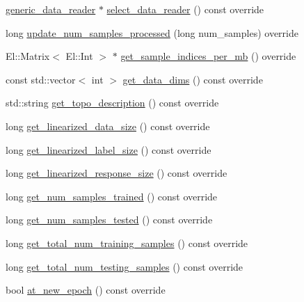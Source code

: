 \begin{DoxyCompactItemize}
\hyperlink{classlbann_1_1generic__data__reader}{generic\+\_\+data\+\_\+reader} $\ast$ \hyperlink{classlbann_1_1generic__input__layer_a9783805369ec7cfe5ce61c81baa5d2e2}{select\+\_\+data\+\_\+reader} () const override
\item 
long \hyperlink{classlbann_1_1generic__input__layer_a0c2f123432ec6af168012cc8699a1d3f}{update\+\_\+num\+\_\+samples\+\_\+processed} (long num\+\_\+samples) override
\item 
El\+::\+Matrix$<$ El\+::\+Int $>$ $\ast$ \hyperlink{classlbann_1_1generic__input__layer_a749741781204b17c8ca172a9a405a90e}{get\+\_\+sample\+\_\+indices\+\_\+per\+\_\+mb} () override
\item 
const std\+::vector$<$ int $>$ \hyperlink{classlbann_1_1generic__input__layer_a6008b13521d27d6139201fa374b088eb}{get\+\_\+data\+\_\+dims} () const override
\item 
std\+::string \hyperlink{classlbann_1_1generic__input__layer_a36d9962105ca89889e3f38f1c1801560}{get\+\_\+topo\+\_\+description} () const override
\item 
long \hyperlink{classlbann_1_1generic__input__layer_aca46cbf29ad2762e9329b46ab2ad1ae7}{get\+\_\+linearized\+\_\+data\+\_\+size} () const override
\item 
long \hyperlink{classlbann_1_1generic__input__layer_ab6c24db7e2b8e73e7d7894e51246dc5e}{get\+\_\+linearized\+\_\+label\+\_\+size} () const override
\item 
long \hyperlink{classlbann_1_1generic__input__layer_a6e5e587aa5b32bdfd2dd579a2746885d}{get\+\_\+linearized\+\_\+response\+\_\+size} () const override
\item 
long \hyperlink{classlbann_1_1generic__input__layer_a95a7a5ad2a6089ffb9197632015e6062}{get\+\_\+num\+\_\+samples\+\_\+trained} () const override
\item 
long \hyperlink{classlbann_1_1generic__input__layer_a68b162bcc5fdfe2bb7279eb5d83cf884}{get\+\_\+num\+\_\+samples\+\_\+tested} () const override
\item 
long \hyperlink{classlbann_1_1generic__input__layer_a5fc757d16e26739cd10e5eabafa6a32b}{get\+\_\+total\+\_\+num\+\_\+training\+\_\+samples} () const override
\item 
long \hyperlink{classlbann_1_1generic__input__layer_ab5b5318cf000fbdaf35a3545335b60b2}{get\+\_\+total\+\_\+num\+\_\+testing\+\_\+samples} () const override
\item 
bool \hyperlink{classlbann_1_1generic__input__layer_a8b375ab97f38166872e4aa9baeca0715}{at\+\_\+new\+\_\+epoch} () const override

\end{DoxyCompactItemize}
